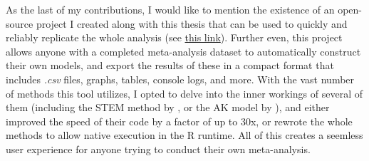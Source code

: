 As the last of my contributions, I would like to mention the existence of an open-source project I created along with this thesis that can be used to quickly and reliably replicate the whole analysis (see \href{https://github.com/PetrCala/Diploma-Thesis}{this link}). Further even, this project allows anyone with a completed meta-analysis dataset to automatically construct their own models, and export the results of these in a compact format that includes \textit{.csv} files, graphs, tables, console logs, and more. With the vast number of methods this tool utilizes, I opted to delve into the inner workings of several of them (including the STEM method by \cite{Furukawa2019Stem}, or the AK model by \cite{Bom2019Kink}), and either improved the speed of their code by a factor of up to 30x, or rewrote the whole methods to allow native execution in the R runtime. All of this creates a seemless user experience for anyone trying to conduct their own meta-analysis.

